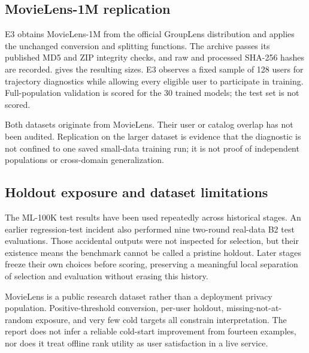 \subsection{MovieLens-1M replication}
E3 obtains MovieLens-1M from the official GroupLens distribution and applies
the unchanged conversion and splitting functions. The archive passes its
published MD5 and ZIP integrity checks, and raw and processed SHA-256 hashes
are recorded.  gives the resulting sizes. E3 observes a fixed
sample of 128 users for trajectory diagnostics while allowing every eligible
user to participate in training. Full-population validation is scored for
the 30 trained models; the test set is not scored.

Both datasets originate from MovieLens. Their user or catalog overlap has
not been audited. Replication on the larger dataset is evidence that the
diagnostic is not confined to one saved small-data training run; it is not
proof of independent populations or cross-domain generalization.

\subsection{Holdout exposure and dataset limitations}
The ML-100K test results have been used repeatedly across historical stages.
An earlier regression-test incident also performed nine two-round real-data
B2 test evaluations. Those accidental outputs were not inspected for selection,
but their existence means the benchmark cannot be called a pristine holdout.
Later stages freeze their own choices before scoring, preserving a meaningful
local separation of selection and evaluation without erasing this history.

MovieLens is a public research dataset rather than a deployment privacy
population. Positive-threshold conversion, per-user holdout, missing-not-at-random
exposure, and very few cold targets all constrain interpretation. The report
does not infer a reliable cold-start improvement from fourteen examples, nor
does it treat offline rank utility as user satisfaction in a live service.
